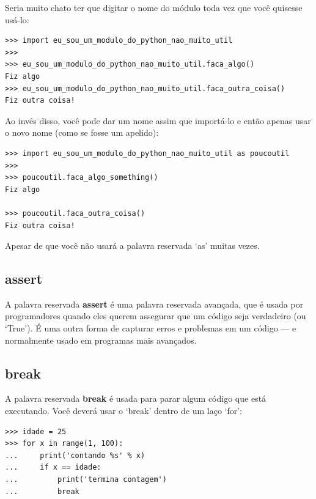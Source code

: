 \noindent
Seria muito chato ter que digitar o nome do módulo toda vez que você quisesse usá-lo:

\begin{listingignore}
\begin{verbatim}
>>> import eu_sou_um_modulo_do_python_nao_muito_util
>>>
>>> eu_sou_um_modulo_do_python_nao_muito_util.faca_algo()
Fiz algo
>>> eu_sou_um_modulo_do_python_nao_muito_util.faca_outra_coisa()
Fiz outra coisa!
\end{verbatim}
\end{listingignore}

\noindent
Ao invés disso, você pode dar um nome assim que importá-lo e então apenas usar o novo nome (como se fosse um apelido):

\begin{listingignore}
\begin{verbatim}
>>> import eu_sou_um_modulo_do_python_nao_muito_util as poucoutil
>>>
>>> poucoutil.faca_algo_something()
Fiz algo

>>> poucoutil.faca_outra_coisa()
Fiz outra coisa!
\end{verbatim}
\end{listingignore}

\noindent
Apesar de que você não usará a palavra reservada `as' muitas vezes.

\subsection*{assert}

A palavra reservada \textbf{assert} é uma palavra reservada avançada, que é usada por programadores quando eles querem assegurar que um código seja verdadeiro (ou `True'). É uma outra forma de capturar erros e problemas em um código --- e normalmente usado em programas mais avançados.

\subsection*{break}

A palavra reservada \textbf{break} é usada para parar algum código que está executando. Você deverá usar o `break' dentro de um laço `for':

\begin{listing}
\begin{verbatim}
>>> idade = 25
>>> for x in range(1, 100):
...     print('contando %s' % x)
...     if x == idade:
...         print('termina contagem')
...         break
\end{verbatim}
\end{listing}

